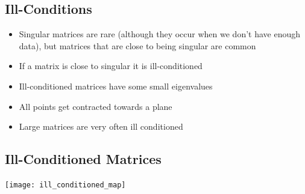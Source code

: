 \begin{slide}
  \section{Ill-Conditions}

  \begin{PauseHighLight}
    \begin{itemize}
    \item Singular matrices are rare (although they occur when we don't
      have enough data), but matrices that are close to
      being singular are common\pause
    \item If a matrix is close to singular it is ill-conditioned\pause
    \item Ill-conditioned matrices have some small eigenvalues\pause
    \item All points get contracted towards a plane\pause
    \item Large matrices are very often ill conditioned\pause
    \end{itemize}
  \end{PauseHighLight}
\end{slide}


\begin{slide}
  \section[-1]{Ill-Conditioned Matrices}

  \begin{PauseHighLight}

    \begin{center}
      \texttt{[image: ill\_conditioned\_map]}
    \end{center}

  \end{PauseHighLight}
\end{slide}


